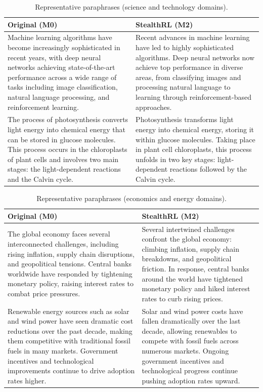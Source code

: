 \documentclass[11pt]{article}
\begin{document}
\begin{table}[H]
\centering
\small
\setlength{\tabcolsep}{4pt}
\begin{tabularx}{\linewidth}{X X}
\toprule
\textbf{Original (M0)} & \textbf{StealthRL (M2)} \\
\midrule
Machine learning algorithms have become increasingly sophisticated in recent years, with deep neural networks achieving state-of-the-art performance across a wide range of tasks including image classification, natural language processing, and reinforcement learning. &
Recent advances in machine learning have led to highly sophisticated algorithms. Deep neural networks now achieve top performance in diverse areas, from classifying images and processing natural language to learning through reinforcement-based approaches. \\
\midrule
The process of photosynthesis converts light energy into chemical energy that can be stored in glucose molecules. This process occurs in the chloroplasts of plant cells and involves two main stages: the light-dependent reactions and the Calvin cycle. &
Photosynthesis transforms light energy into chemical energy, storing it within glucose molecules. Taking place in plant cell chloroplasts, this process unfolds in two key stages: light-dependent reactions followed by the Calvin cycle. \\
\bottomrule
\end{tabularx}
\caption{Representative paraphrases (science and technology domains).}
\label{tab:qual2}
\end{table}

\begin{table}[H]
\centering
\small
\setlength{\tabcolsep}{4pt}
\begin{tabularx}{\linewidth}{X X}
\toprule
\textbf{Original (M0)} & \textbf{StealthRL (M2)} \\
\midrule
The global economy faces several interconnected challenges, including rising inflation, supply chain disruptions, and geopolitical tensions. Central banks worldwide have responded by tightening monetary policy, raising interest rates to combat price pressures. &
Several intertwined challenges confront the global economy: climbing inflation, supply chain breakdowns, and geopolitical friction. In response, central banks around the world have tightened monetary policy and hiked interest rates to curb rising prices. \\
\midrule
Renewable energy sources such as solar and wind power have seen dramatic cost reductions over the past decade, making them competitive with traditional fossil fuels in many markets. Government incentives and technological improvements continue to drive adoption rates higher. &
Solar and wind power costs have fallen dramatically over the last decade, allowing renewables to compete with fossil fuels across numerous markets. Ongoing government incentives and technological progress continue pushing adoption rates upward. \\
\bottomrule
\end{tabularx}
\caption{Representative paraphrases (economics and energy domains).}
\label{tab:qual3}
\end{table}
\end{document}

